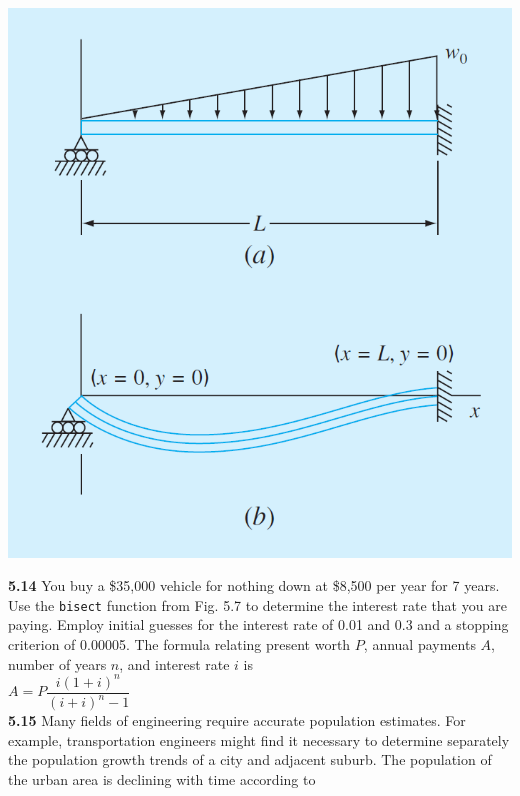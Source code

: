 \documentclass[../main.tex]{subfiles}
\begin{document}
\begin{multicols}{2}
    \noindent
    \begin{minipage}{\linewidth}
        \centering
        \includegraphics[width=\linewidth]{./images/problem_5_9_2}
    \end{minipage}
    \bigskip

    \noindent\textbf{5.14} You buy a \$35,000 vehicle for nothing down at \$8,500
    per year for 7 years. Use the \texttt{bisect} function from Fig. 5.7
    to determine the interest rate that you are paying. Employ
    initial guesses for the interest rate of 0.01 and 0.3 and a stopping
    criterion of 0.00005. The formula relating present
    worth $P$, annual payments $A$, number of years $n$, and interest
    rate $i$ is\\

    $A = P\dfrac{i(1+i)^n}{(i+i)^n -1}$\\

    \noindent\textbf{5.15} Many fields of engineering require accurate population
    estimates. For example, transportation engineers might find
    it necessary to determine separately the population growth
    trends of a city and adjacent suburb. The population of the
    urban area is declining with time according to\\


\end{multicols}
\end{document}
